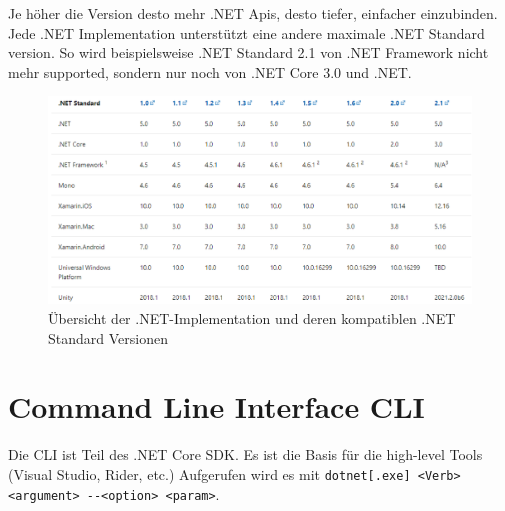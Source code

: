 \documentclass[
a4paper,
oneside,
10pt,
fleqn,
headsepline,
toc=listofnumbered, 
bibliography=totocnumbered]{scrartcl}
\let\stdsection\section
\renewcommand\section{\clearpage\stdsection}
\begin{document}
Je höher die Version desto mehr .NET Apis, desto tiefer, einfacher einzubinden. Jede .NET Implementation unterstützt eine andere maximale .NET Standard version. So wird beispielsweise .NET Standard 2.1 von .NET Framework nicht mehr supported, sondern nur noch von .NET Core 3.0 und .NET.
\begin{figure}[!ht]
	\centering
	\includegraphics[width=0.9\linewidth]{images/standard-versionen}
	\caption{Übersicht der .NET-Implementation und deren kompatiblen .NET Standard Versionen}
	\label{fig:standardversionen}
\end{figure}
\section{Command Line Interface CLI}
Die CLI ist Teil des .NET Core SDK. Es ist die Basis für die high-level Tools (Visual Studio, Rider, etc.) Aufgerufen wird es mit \lstinline|dotnet[.exe] <Verb> <argument> --<option> <param>|.
\end{document}
